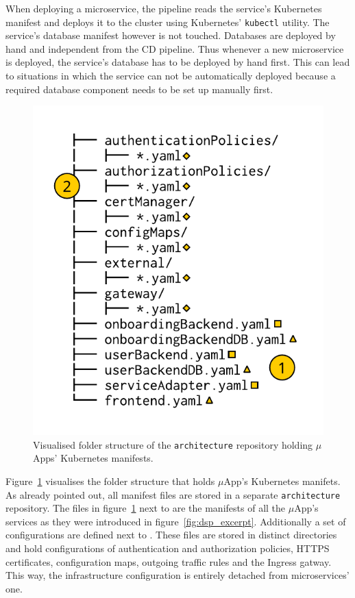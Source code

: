 When deploying a microservice, the pipeline reads the service's Kubernetes
manifest and deploys it to the cluster using Kubernetes' \texttt{kubectl}
utility. The service's database manifest however is not touched. Databases are
deployed by hand and independent from the \ac{CD} pipeline. Thus whenever a new
microservice is deployed, the service's database has to be deployed by hand
first. This can lead to situations in which the service can not be
automatically deployed because a required database component needs to be set up
manually first.

\begin{figure}[H]
\begin{center}
  \includegraphics[scale=0.8]{images/figures/manifests_folder_naive.pdf}
\end{center}
\caption{Visualised folder structure of the \texttt{architecture} repository
holding $\mu$Apps' Kubernetes manifests.}%
\label{fig:manifests_folder_naive}
\end{figure}


Figure~\ref{fig:manifests_folder_naive} visualises the folder structure that
holds $\mu$App's Kubernetes manifets. As already pointed out, all manifest
files are stored in a separate \texttt{architecture} repository. The files in
figure~\ref{fig:manifests_folder_naive} next to  are the manifests
of all the $\mu$App's services as they were introduced in
figure~\ref{fig:dsp_excerpt}. Additionally a set of configurations are defined
next to . These files are stored in distinct directories and hold
configurations of authentication and authorization policies, \ac{HTTPS}
certificates, configuration maps, outgoing traffic rules and the Ingress
gatway. This way, the infrastructure configuration is entirely detached from
microservices' one.

